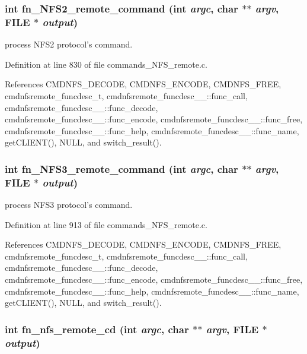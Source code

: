 \subsubsection{\setlength{\rightskip}{0pt plus 5cm}int fn\_\-NFS2\_\-remote\_\-command (int {\em argc}, char $\ast$$\ast$ {\em argv}, FILE $\ast$ {\em output})}\label{commands__NFS__remote_8c_a38}


process NFS2 protocol's command. 

Definition at line 830 of file commands\_\-NFS\_\-remote.c.

References CMDNFS\_\-DECODE, CMDNFS\_\-ENCODE, CMDNFS\_\-FREE, cmdnfsremote\_\-funcdesc\_\-t, cmdnfsremote\_\-funcdesc\_\-\_\-::func\_\-call, cmdnfsremote\_\-funcdesc\_\-\_\-::func\_\-decode, cmdnfsremote\_\-funcdesc\_\-\_\-::func\_\-encode, cmdnfsremote\_\-funcdesc\_\-\_\-::func\_\-free, cmdnfsremote\_\-funcdesc\_\-\_\-::func\_\-help, cmdnfsremote\_\-funcdesc\_\-\_\-::func\_\-name, get\-CLIENT(), NULL, and switch\_\-result().
\subsubsection{\setlength{\rightskip}{0pt plus 5cm}int fn\_\-NFS3\_\-remote\_\-command (int {\em argc}, char $\ast$$\ast$ {\em argv}, FILE $\ast$ {\em output})}\label{commands__NFS__remote_8c_a39}


process NFS3 protocol's command. 

Definition at line 913 of file commands\_\-NFS\_\-remote.c.

References CMDNFS\_\-DECODE, CMDNFS\_\-ENCODE, CMDNFS\_\-FREE, cmdnfsremote\_\-funcdesc\_\-t, cmdnfsremote\_\-funcdesc\_\-\_\-::func\_\-call, cmdnfsremote\_\-funcdesc\_\-\_\-::func\_\-decode, cmdnfsremote\_\-funcdesc\_\-\_\-::func\_\-encode, cmdnfsremote\_\-funcdesc\_\-\_\-::func\_\-free, cmdnfsremote\_\-funcdesc\_\-\_\-::func\_\-help, cmdnfsremote\_\-funcdesc\_\-\_\-::func\_\-name, get\-CLIENT(), NULL, and switch\_\-result().
\subsubsection{\setlength{\rightskip}{0pt plus 5cm}int fn\_\-nfs\_\-remote\_\-cd (int {\em argc}, char $\ast$$\ast$ {\em argv}, FILE $\ast$ {\em output})}\label{commands__NFS__remote_8c_a61}


